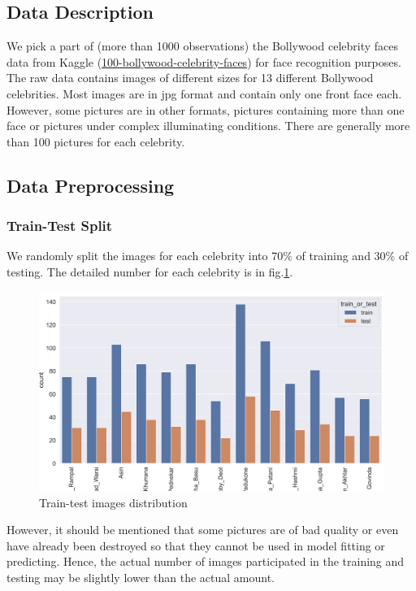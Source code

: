 \subsection{Data Description}
We pick a part of (more than 1000 observations) the Bollywood celebrity faces data from Kaggle (\href{https://www.kaggle.com/datasets/havingfun/100-bollywood-celebrity-faces}{100-bollywood-celebrity-faces}) for face recognition purposes. The raw data contains images of different sizes for 13 different Bollywood celebrities. Most images are in jpg format and contain only one front face each. However, some pictures are in other formats, pictures containing more than one face or pictures under complex illuminating conditions. There are generally more than 100 pictures for each celebrity. 


\subsection{Data Preprocessing}

\subsubsection{Train-Test Split}
We randomly split the images for each celebrity into 70\% of training and 30\% of testing. The detailed number for each celebrity is in fig.\ref{pic:train_test}. 
\begin{figure}[!htbp]
    \centering\includegraphics[width=12cm]{./figures/train_test.png}
    \caption{Train-test images distribution}
    \label{pic:train_test}
\end{figure}
However, it should be mentioned that some pictures are of bad quality or even have already been destroyed so that they cannot be used in model fitting or predicting. Hence, the actual number of images participated in the training and testing may be slightly lower than the actual amount.


